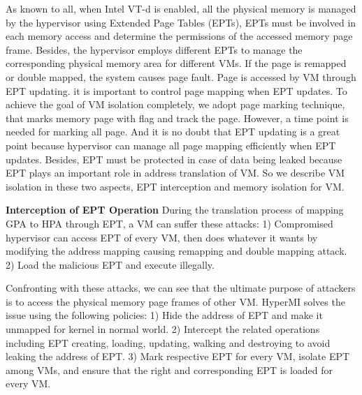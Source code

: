 \documentclass[conference]{IEEEtran}
\begin{document}
As known to all, when Intel VT-d is enabled, all the physical memory is managed by the hypervisor using Extended Page Tables (EPTs), EPTs must be involved in each memory access and determine the permissions of the accessed memory page frame. Besides, the hypervisor employs different EPTs to manage the corresponding physical memory area for different VMs. If the page is remapped or double mapped, the system causes page fault. Page is accessed by VM through EPT updating.
it is important to control page mapping when EPT updates. To achieve the goal of VM isolation completely, we adopt page marking technique, that marks memory page with flag and track the page. However, a time point is needed for marking all page. And it is no doubt that EPT updating is a great point because hypervisor can manage all page mapping efficiently when EPT updates. Besides, EPT must be protected in case of data being leaked because EPT plays an important role in address translation of VM. So we describe VM isolation in these two aspects, EPT interception and memory isolation for VM.


\textbf{Interception of EPT Operation }
During the translation process of mapping GPA to HPA through EPT, a VM can suffer these attacks: 1) Compromised hypervisor can access EPT of every VM, then does whatever it wants by modifying the address mapping causing remapping and double mapping attack. 2) Load the malicious EPT and execute illegally.

Confronting with these attacks, we can see that the ultimate purpose of attackers is to access the physical memory page frames of other VM. HyperMI solves the issue using the following policies: 1) Hide the address of EPT and make it unmapped for kernel in normal world. 2) Intercept the related operations including EPT creating, loading, updating, walking and destroying to avoid leaking the address of EPT. 3) Mark respective EPT for every VM, isolate EPT among VMs, and ensure that the right and corresponding EPT is loaded for every VM.
\end{document}
